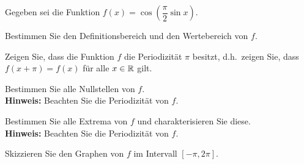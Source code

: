 \Aufgabe[e]{}
{

Gegeben sei die Funktion $f(x) = \cos \left(\dfrac{\pi}{2} \sin x\right)$.

\begin{iii}
 
 \item Bestimmen Sie den Definitionsbereich und den Wertebereich von $f$. 
 
 \item Zeigen Sie, dass die Funktion $f$ die Periodizität $\pi$ besitzt, d.h.\ zeigen Sie, dass $f(x+\pi) = f(x)$ für alle $x\in \mathbb{R}$ gilt.
 
 \item Bestimmen Sie alle Nullstellen von $f$.\\[0.5ex]
 \textbf{Hinweis:} Beachten Sie die Periodizität von $f$.
 
 \item Bestimmen Sie alle Extrema von $f$ und charakterisieren Sie diese.\\[0.5ex]
 \textbf{Hinweis:} Beachten Sie die Periodizität von $f$.
 
 \item Skizzieren Sie den Graphen von $f$ im Intervall $[-\pi,2\pi]$. 
 
\end{iii}
}


